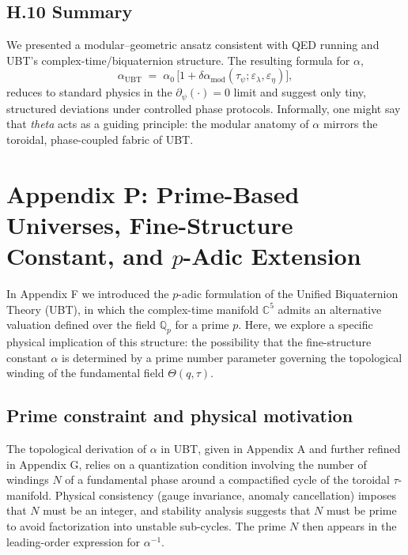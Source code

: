 \subsection*{H.10 Summary}
We presented a modular--geometric ansatz consistent with QED running and UBT's complex-time/biquaternion structure. 
The resulting formula for $\alpha$,
\begin{equation}
\alpha_{\mathrm{UBT}} \;=\; \alpha_0\,\big[ 1 + \delta\alpha_{\mathrm{mod}}(\tau_\psi;\varepsilon_\lambda,\varepsilon_\eta) \big],
\end{equation}
reduces to standard physics in the $\partial_\psi(\cdot)=0$ limit and suggest only tiny, structured deviations under controlled phase protocols.
Informally, one might say that \emph{theta} acts as a guiding principle: the modular anatomy of $\alpha$ mirrors the toroidal, phase-coupled fabric of UBT.




\appendix
\section*{Appendix P: Prime-Based Universes, Fine-Structure Constant, and $p$-Adic Extension}

In Appendix F we introduced the $p$-adic formulation of the Unified Biquaternion Theory (UBT), in which the complex-time manifold $\mathbb{C}^5$ admits an alternative valuation defined over the field $\mathbb{Q}_p$ for a prime $p$. Here, we explore a specific physical implication of this structure: the possibility that the fine-structure constant $\alpha$ is determined by a prime number parameter governing the topological winding of the fundamental field $\Theta(q,\tau)$.

\subsection*{Prime constraint and physical motivation}
The topological derivation of $\alpha$ in UBT, given in Appendix A and further refined in Appendix G, relies on a quantization condition involving the number of windings $N$ of a fundamental phase around a compactified cycle of the toroidal $\tau$-manifold. Physical consistency (gauge invariance, anomaly cancellation) imposes that $N$ must be an integer, and stability analysis suggests that $N$ must be prime to avoid factorization into unstable sub-cycles. The prime $N$ then appears in the leading-order expression for $\alpha^{-1}$.

